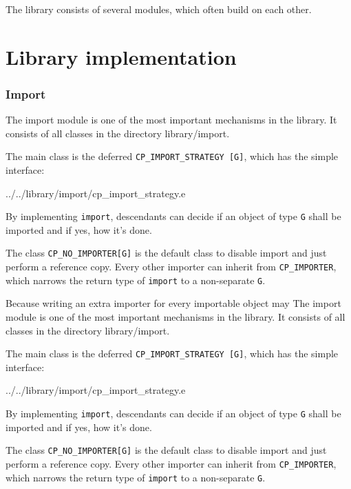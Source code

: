 \documentclass[a4paper,10pt]{report}
\newcommand{\dir} [1] [] {#1}
\begin{document}
The library consists of several modules, which often build on each other.

\section{Library implementation}

\subsubsection{Import}
\label{sec:modules:import}

The import module is one of the most important mechanisms in the library.
It consists of all classes in the directory \dir{library/import}.

The main class is the deferred \lstinline!CP_IMPORT_STRATEGY [G]!, which has the simple interface:


 {../../library/import/cp_import_strategy.e}

By implementing \lstinline!import!, descendants can decide if an object of type \lstinline!G! shall be imported and if yes, how it's done.

The class \lstinline!CP_NO_IMPORTER[G]! is the default class to disable import and just perform a reference copy.
Every other importer can inherit from \lstinline!CP_IMPORTER!, which narrows the return type of \lstinline!import! to a non-separate \lstinline!G!.

Because writing an extra importer for every importable object may
The import module is one of the most important mechanisms in the library.
It consists of all classes in the directory \dir{library/import}.

The main class is the deferred \lstinline!CP_IMPORT_STRATEGY [G]!, which has the simple interface:


 {../../library/import/cp_import_strategy.e}

By implementing \lstinline!import!, descendants can decide if an object of type \lstinline!G! shall be imported and if yes, how it's done.

The class \lstinline!CP_NO_IMPORTER[G]! is the default class to disable import and just perform a reference copy.
Every other importer can inherit from \lstinline!CP_IMPORTER!, which narrows the return type of \lstinline!import! to a non-separate \lstinline!G!.
\end{document}
